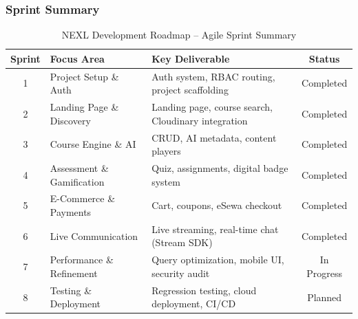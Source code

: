 \subsubsection*{Sprint Summary}

\begin{table}[H]
\centering
\renewcommand{\arraystretch}{1.4}
\begin{tabular}{|c|l|l|c|}
\hline
\textbf{Sprint} & \textbf{Focus Area} & \textbf{Key Deliverable} & \textbf{Status} \\
\hline
1 & Project Setup \& Auth         & Auth system, RBAC routing, project scaffolding        & Completed   \\
2 & Landing Page \& Discovery     & Landing page, course search, Cloudinary integration   & Completed   \\
3 & Course Engine \& AI           & CRUD, AI metadata, content players                    & Completed   \\
4 & Assessment \& Gamification    & Quiz, assignments, digital badge system               & Completed   \\
5 & E-Commerce \& Payments        & Cart, coupons, eSewa checkout                         & Completed   \\
6 & Live Communication            & Live streaming, real-time chat (Stream SDK)           & Completed   \\
7 & Performance \& Refinement     & Query optimization, mobile UI, security audit         & In Progress \\
8 & Testing \& Deployment         & Regression testing, cloud deployment, CI/CD           & Planned     \\
\hline
\end{tabular}
\caption{NEXL Development Roadmap -- Agile Sprint Summary}
\label{tab:agile-sprints}
\end{table}
